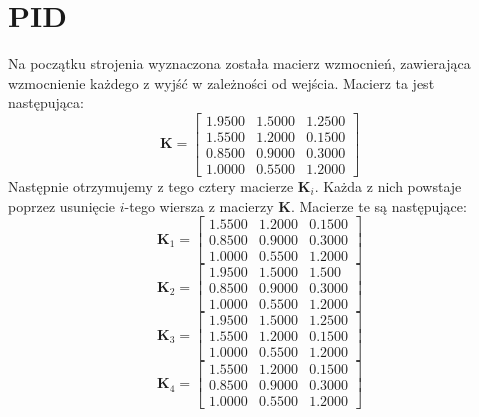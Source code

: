 \chapter{PID}
Na początku strojenia wyznaczona została macierz wzmocnień, zawierająca
wzmocnienie każdego z wyjść w zależności od wejścia. Macierz ta jest następująca:
\begin{equation}
  \bm{K} =
  \begin{bmatrix}
    \num{1,9500}  &  \num{1,5000}  &  \num{1,2500} \\
    \num{1,5500}  &  \num{1,2000}  &  \num{0,1500} \\
    \num{0,8500}  &  \num{0,9000}  &  \num{0,3000} \\
    \num{1,0000}  &  \num{0,5500}  &  \num{1,2000}
  \end{bmatrix}
\end{equation}
Następnie otrzymujemy z tego cztery macierze $\bm{K}_i$. Każda z nich powstaje poprzez
usunięcie $i$-tego wiersza z macierzy $\bm{K}$. Macierze te są następujące:
\begin{equation}
  \bm{K}_1 =
  \begin{bmatrix}
    \num{1,5500}   & \num{1,2000} &   \num{0,1500} \\
        \num{0,8500}   & \num{0,9000} &   \num{0,3000} \\
        \num{1,0000}   & \num{0,5500}  &  \num{1,2000}
  \end{bmatrix}
\end{equation}
\begin{equation}
  \bm{K}_2 =
  \begin{bmatrix}
    \num{1,9500} &   \num{1,5000} &   \num{1,500} \\
      \num{0,8500}   & \num{0,9000} &   \num{0,3000} \\
       \num{1,0000}   & \num{0,5500} &   \num{1,2000}
  \end{bmatrix}
\end{equation}
\begin{equation}
  \bm{K}_3 =
  \begin{bmatrix}
    \num{1,9500} &   \num{1,5000} &   \num{1,2500} \\
       \num{1,5500}   & \num{1,2000} &   \num{0,1500} \\
       \num{1,0000}   & \num{0,5500}  &  \num{1,2000}
  \end{bmatrix}
\end{equation}
\begin{equation}
  \bm{K}_4 =
  \begin{bmatrix}
    \num{1,5500} &   \num{1,2000} &   \num{0,1500} \\
       \num{0,8500}   & \num{0,9000} &   \num{0,3000} \\
       \num{1,0000}   & \num{0,5500}  &  \num{1,2000}
  \end{bmatrix}
\end{equation}
